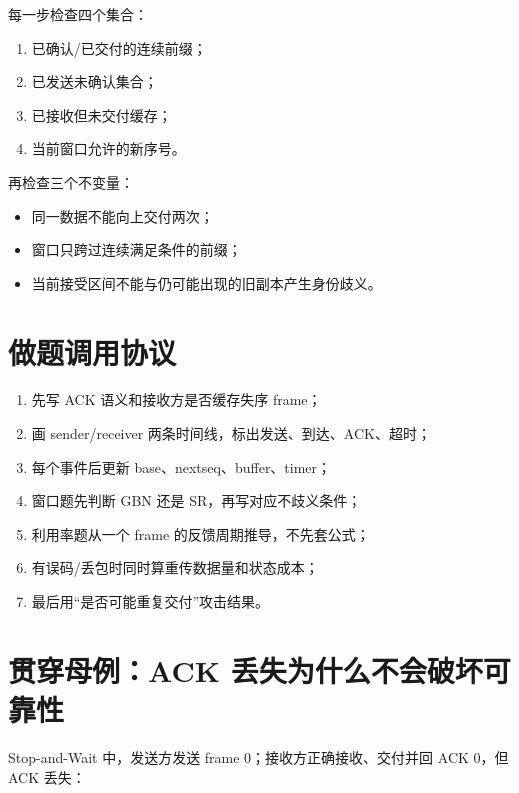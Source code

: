 \documentclass[UTF8,fontset=none,11pt,a4paper]{ctexart}
\providecommand{\tightlist}{\setlength{\itemsep}{0pt}\setlength{\parskip}{0pt}}
\begin{document}
每一步检查四个集合：

\begin{enumerate}
\def\labelenumi{\arabic{enumi}.}
\tightlist
\item
  已确认/已交付的连续前缀；
\item
  已发送未确认集合；
\item
  已接收但未交付缓存；
\item
  当前窗口允许的新序号。
\end{enumerate}

再检查三个不变量：

\begin{itemize}
\tightlist
\item
  同一数据不能向上交付两次；
\item
  窗口只跨过连续满足条件的前缀；
\item
  当前接受区间不能与仍可能出现的旧副本产生身份歧义。
\end{itemize}

\section{做题调用协议}\label{10-ux505aux9898ux8c03ux7528ux534fux8bae}

\begin{enumerate}
\def\labelenumi{\arabic{enumi}.}
\tightlist
\item
  先写 ACK 语义和接收方是否缓存失序 frame；
\item
  画 sender/receiver 两条时间线，标出发送、到达、ACK、超时；
\item
  每个事件后更新 base、nextseq、buffer、timer；
\item
  窗口题先判断 GBN 还是 SR，再写对应不歧义条件；
\item
  利用率题从一个 frame 的反馈周期推导，不先套公式；
\item
  有误码/丢包时同时算重传数据量和状态成本；
\item
  最后用``是否可能重复交付''攻击结果。
\end{enumerate}

\section{贯穿母例：ACK
丢失为什么不会破坏可靠性}\label{11-ux8d2fux7a7fux6bcdux4f8back-ux4e22ux5931ux4e3aux4ec0ux4e48ux4e0dux4f1aux7834ux574fux53efux9760ux6027}

Stop-and-Wait 中，发送方发送 frame 0；接收方正确接收、交付并回 ACK 0，但
ACK 丢失：
\end{document}
